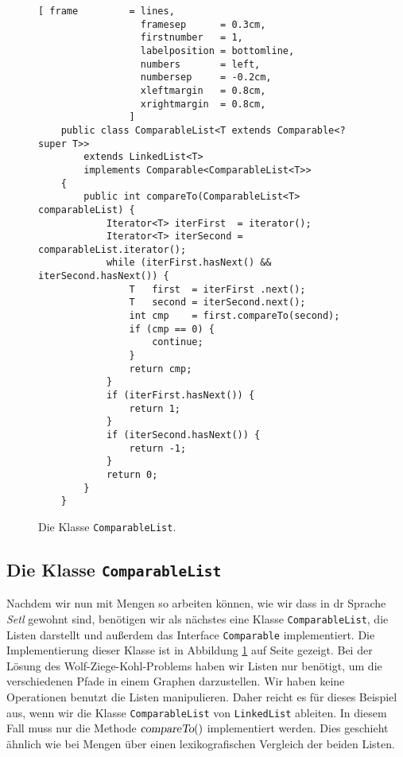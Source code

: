 \begin{figure}[!ht]
\centering
\begin{Verbatim}[ frame         = lines, 
                  framesep      = 0.3cm, 
                  firstnumber   = 1,
                  labelposition = bottomline,
                  numbers       = left,
                  numbersep     = -0.2cm,
                  xleftmargin   = 0.8cm,
                  xrightmargin  = 0.8cm,
                ]
    public class ComparableList<T extends Comparable<? super T>> 
        extends LinkedList<T>
        implements Comparable<ComparableList<T>>
    {
        public int compareTo(ComparableList<T> comparableList) { 
            Iterator<T> iterFirst  = iterator();
            Iterator<T> iterSecond = comparableList.iterator();
            while (iterFirst.hasNext() && iterSecond.hasNext()) {
                T   first  = iterFirst .next();
                T   second = iterSecond.next();
                int cmp    = first.compareTo(second);
                if (cmp == 0) {
                    continue;
                }
                return cmp;
            }
            if (iterFirst.hasNext()) {
                return 1;
            }       
            if (iterSecond.hasNext()) {
                return -1;
            }
            return 0;
        }
    }
\end{Verbatim}
\vspace*{-0.3cm}
\caption{Die Klasse \texttt{ComparableList}.}
\label{fig:ComparableList.java}
\end{figure}

\subsection{Die Klasse \texttt{ComparableList}}
Nachdem wir nun mit Mengen so arbeiten k\"onnen, wie wir dass in dr Sprache \textsl{Setl} gewohnt sind,
ben\"otigen wir als n\"achstes eine Klasse \texttt{ComparableList}, die Listen darstellt und au{\ss}erdem das
Interface \texttt{Comparable} implementiert.  Die Implementierung dieser Klasse ist in Abbildung
\ref{fig:ComparableList.java} auf Seite \pageref{fig:ComparableList.java} gezeigt.  Bei der L\"osung des
Wolf-Ziege-Kohl-Problems haben wir Listen nur ben\"otigt, um die verschiedenen Pfade in einem Graphen
darzustellen.  Wir haben keine Operationen benutzt die Listen manipulieren.  Daher reicht es f\"ur dieses
Beispiel aus, wenn wir die Klasse \texttt{ComparableList} von \texttt{LinkedList} ableiten.  In diesem
Fall muss nur die Methode $\textsl{compareTo}()$ implementiert werden.  Dies geschieht \"ahnlich wie bei
Mengen \"uber einen lexikografischen Vergleich der beiden Listen.
\pagebreak
\vspace*{\fill}


